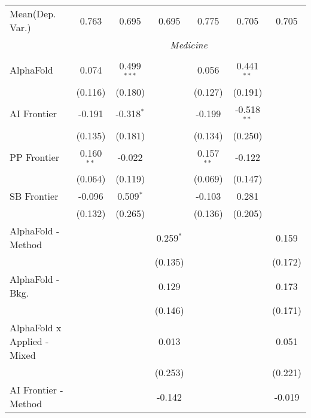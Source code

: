 \begin{tabular}{lcccccc}
Mean(Dep. Var.) & 0.763 & 0.695 & 0.695 & 0.775 & 0.705 & 0.705 \\
 & \multicolumn{6}{c}{\textit{Medicine}} \\ \\
   AlphaFold                   & 0.074        & 0.499$^{***}$ &             & 0.056        & 0.441$^{**}$  &   \\   
                               & (0.116)      & (0.180)       &             & (0.127)      & (0.191)       &   \\   
   AI Frontier                 & -0.191       & -0.318$^{*}$  &             & -0.199       & -0.518$^{**}$ &   \\   
                               & (0.135)      & (0.181)       &             & (0.134)      & (0.250)       &   \\   
   PP Frontier                 & 0.160$^{**}$ & -0.022        &             & 0.157$^{**}$ & -0.122        &   \\   
                               & (0.064)      & (0.119)       &             & (0.069)      & (0.147)       &   \\   
   SB Frontier                 & -0.096       & 0.509$^{*}$   &             & -0.103       & 0.281         &   \\   
                               & (0.132)      & (0.265)       &             & (0.136)      & (0.205)       &   \\   
   AlphaFold - Method          &              &               & 0.259$^{*}$ &              &               & 0.159\\   
                               &              &               & (0.135)     &              &               & (0.172)\\   
   AlphaFold - Bkg.            &              &               & 0.129       &              &               & 0.173\\   
                               &              &               & (0.146)     &              &               & (0.171)\\   
   AlphaFold x Applied - Mixed &              &               & 0.013       &              &               & 0.051\\   
                               &              &               & (0.253)     &              &               & (0.221)\\   
   AI Frontier - Method        &              &               & -0.142      &              &               & -0.019\\   

\end{tabular}
